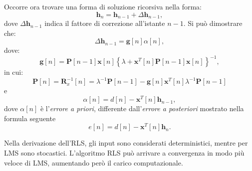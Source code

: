\documentclass[12pt,a4paper,titlepage]{article}
\begin{document}
Occorre ora trovare una forma di soluzione ricorsiva nella forma:
\begin{equation*}
\mathbf{h}_n = \mathbf{h}_{n-1} + \Delta \mathbf{h}_{n-1},
\end{equation*}
dove $\Delta \mathbf{h}_{n-1}$ indica il fattore di correzione all'istante $n-1$. Si può dimostrare che:
\begin{equation*}
\Delta \mathbf{h}_{n-1} = \mathbf{g}[n]\alpha[n],
\end{equation*}
dove:
\begin{equation*}
\mathbf{g}[n] = \mathbf{P}[n-1]\mathbf{x}[n]\left\{\lambda + \mathbf{x}^T[n] \mathbf{P}[n-1] \mathbf{x}[n]\right\}^{-1},
\end{equation*}
in cui:
\begin{equation*}
\mathbf{P}[n] = \mathbf{R}^{-1}_x[n] = \lambda ^ {-1} \mathbf{P}[n-1] -  \mathbf{g}[n]\mathbf{x}^T[n]\lambda^{-1}\mathbf{P}[n-1]
\end{equation*}
e
\begin{equation*}
\alpha[n] = d[n] - \mathbf{x}^T[n]\mathbf{h}_{n-1},
\end{equation*}
dove $\alpha[n]$ è l'\textit{errore a priori}, differente dall'\textit{errore a posteriori} mostrato nella formula seguente
\begin{equation}
e[n] = d[n] - \mathbf{x}^T[n]\mathbf{h}_{n}.
\end{equation}

Nella derivazione dell'RLS, gli input sono considerati deterministici, mentre per LMS sono stocastici. L'algoritmo RLS può arrivare a convergenza in modo più veloce di LMS, aumentando però il carico computazionale.
\end{document}
